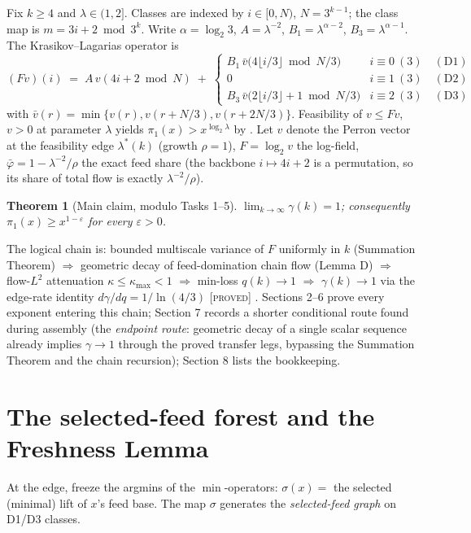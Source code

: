 \documentclass[11pt]{article}
\newtheorem{theorem}{Theorem}[section]
\theoremstyle{definition}
\newcommand{\PROVED}{\textup{[\textsc{proved}]}}
\newcommand{\lam}{\lambda}
\newcommand{\pbar}{\bar\varphi}
\begin{document}
Fix $k \ge 4$ and $\lam \in (1, 2]$. Classes are indexed by $i \in [0, N)$,
$N = 3^{k-1}$; the class map is $m = 3i+2 \bmod 3^k$. Write $\alpha = \log_2 3$,
$A = \lam^{-2}$, $B_1 = \lam^{\alpha-2}$, $B_3 = \lam^{\alpha-1}$. The
Krasikov--Lagarias operator is
\[
(Fv)(i) \;=\; A\,v(4i{+}2 \bmod N) \;+\;
\begin{cases}
B_1\,\bar v\big(4\lfloor i/3\rfloor \bmod N/3\big) & i \equiv 0 \ (3)\quad(\mathrm{D1})\\
0 & i \equiv 1 \ (3)\quad(\mathrm{D2})\\
B_3\,\bar v\big(2\lfloor i/3\rfloor{+}1 \bmod N/3\big) & i \equiv 2 \ (3)\quad(\mathrm{D3})
\end{cases}
\]
with $\bar v(r) = \min\{v(r), v(r+N/3), v(r+2N/3)\}$. Feasibility of $v \le Fv$,
$v > 0$ at parameter $\lam$ yields $\pi_1(x) > x^{\log_2\lam}$ by
\cite[Thm.~2.2]{KL}. Let $v$ denote the Perron vector at the feasibility edge
$\lam^*(k)$ (growth $\rho = 1$), $F = \log_2 v$ the log-field,
$\pbar = 1 - \lam^{-2}/\rho$ the exact feed share (the backbone $i \mapsto 4i+2$
is a permutation, so its share of total flow is exactly $\lam^{-2}/\rho$).

\begin{theorem}[Main claim, modulo Tasks 1--5]\label{thm:main}
$\lim_{k\to\infty} \gamma(k) = 1$; consequently $\pi_1(x) \ge x^{1-\varepsilon}$
for every $\varepsilon > 0$.
\end{theorem}

The logical chain is: bounded multiscale variance of $F$ uniformly in $k$
(Summation Theorem) $\Rightarrow$ geometric decay of feed-domination chain flow
(Lemma D) $\Rightarrow$ flow-$L^2$ attenuation $\kappa \le \kappa_{\max} < 1$
$\Rightarrow$ min-loss $q(k) \to 1$ $\Rightarrow$ $\gamma(k) \to 1$ via the
edge-rate identity $d\gamma/dq = 1/\ln(4/3)$ \PROVED{} \cite{G1}. Sections
2--6 prove every exponent entering this chain; Section 7 records a shorter
conditional route found during assembly (the \emph{endpoint route}:
geometric decay of a single scalar sequence already implies
$\gamma \to 1$ through the proved transfer legs, bypassing the Summation
Theorem and the chain recursion); Section 8 lists the bookkeeping.

\section{The selected-feed forest and the Freshness Lemma}

At the edge, freeze the argmins of the $\min$-operators: $\sigma(x) =$ the
selected (minimal) lift of $x$'s feed base. The map $\sigma$ generates the
\emph{selected-feed graph} on D1/D3 classes.
\end{document}
